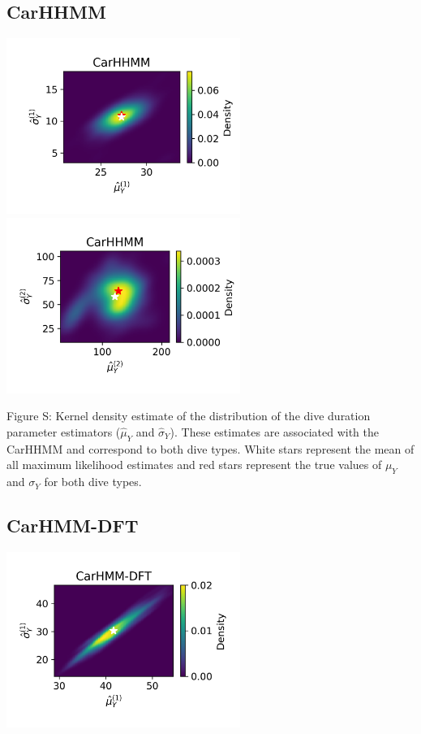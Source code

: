 \documentclass{article}
\begin{document}
        \subsection{CarHHMM}
        \begin{center}
        \includegraphics[width=3in]{../Plots/hhmm_V_MLE_density_dive_duration_-1_0.png}
        \includegraphics[width=3in]{../Plots/hhmm_V_MLE_density_dive_duration_-1_1.png}
        \end{center}
        
        \noindent Figure S: Kernel density estimate of the distribution of the dive duration parameter estimators ($\hat \mu_Y$ and $\hat \sigma_Y$). These estimates are associated with the CarHHMM and correspond to both dive types. White stars represent the mean of all maximum likelihood estimates and red stars represent the true values of $\mu_Y$ and $\sigma_Y$ for both dive types.
        \addtocounter{fignum}{1}
        
        \subsection{CarHMM-DFT}
        \begin{center}
        \includegraphics[width=3in]{../Plots/hmm_FV_MLE_density_dive_duration_-1_0.png}
        \end{center}
        
\end{document}
